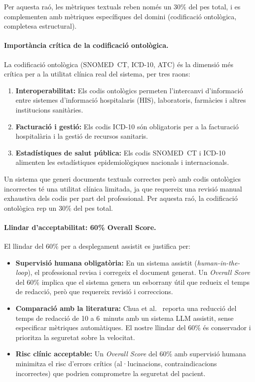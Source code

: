 \documentclass[CAT]{TFUOC}%
\begin{document}
Per aquesta raó, les mètriques textuals reben només un 30\% del pes total, i es complementen amb mètriques específiques del domini (codificació ontològica, completesa estructural).

\paragraph{Importància crítica de la codificació ontològica.}
La codificació ontològica (SNOMED~CT, ICD-10, ATC) és la dimensió més crítica per a la utilitat clínica real del sistema, per tres raons:
\begin{enumerate}
    \item \textbf{Interoperabilitat:} Els codis ontològics permeten l'intercanvi d'informació entre sistemes d'informació hospitalaris (HIS), laboratoris, farmàcies i altres institucions sanitàries.
    \item \textbf{Facturació i gestió:} Els codis ICD-10 són obligatoris per a la facturació hospitalària i la gestió de recursos sanitaris.
    \item \textbf{Estadístiques de salut pública:} Els codis SNOMED~CT i ICD-10 alimenten les estadístiques epidemiològiques nacionals i internacionals.
\end{enumerate}

Un sistema que generi documents textuals correctes però amb codis ontològics incorrectes té una utilitat clínica limitada, ja que requereix una revisió manual exhaustiva dels codis per part del professional. Per aquesta raó, la codificació ontològica rep un 30\% del pes total.

\paragraph{Llindar d'acceptabilitat: 60\% Overall Score.}
El llindar del 60\% per a desplegament assistit es justifica per:
\begin{itemize}
    \item \textbf{Supervisió humana obligatòria:} En un sistema assistit (\textit{human-in-the-loop}), el professional revisa i corregeix el document generat. Un \textit{Overall Score} del 60\% implica que el sistema genera un esborrany útil que redueix el temps de redacció, però que requereix revisió i correccions.
    \item \textbf{Comparació amb la literatura:} Chua et al.~\cite{chua2024discharge} reporta una reducció del temps de redacció de 10 a 6~minuts amb un sistema LLM assistit, sense especificar mètriques automàtiques. El nostre llindar del 60\% és conservador i prioritza la seguretat sobre la velocitat.
    \item \textbf{Risc clínic acceptable:} Un \textit{Overall Score} del 60\% amb supervisió humana minimitza el risc d'errors crítics (al·lucinacions, contraindicacions incorrectes) que podrien comprometre la seguretat del pacient.
\end{itemize}
\end{document}
